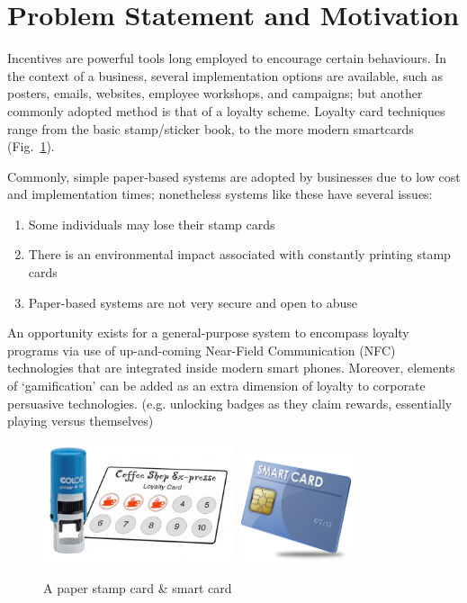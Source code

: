 \section{Problem Statement and Motivation}
Incentives are powerful tools long employed to encourage certain behaviours. In the context of a business, several implementation options are available, such as posters, emails, websites, employee workshops, and campaigns; but another commonly adopted method is that of a loyalty scheme. Loyalty card techniques range from the basic stamp/sticker book, to the more modern smartcards (Fig.~\ref{fig:smartcard}).

Commonly, simple paper-based systems are adopted by businesses due to low cost and implementation times; nonetheless systems like these have several issues:
\begin{enumerate}
\item Some individuals may lose their stamp cards
\item There is an environmental impact associated with constantly printing stamp cards
\item Paper-based systems are not very secure and open to abuse
\end{enumerate}

An opportunity exists for a general-purpose system to encompass loyalty programs via use of up-and-coming Near-Field Communication (NFC) technologies that are integrated inside modern smart phones. Moreover, elements of `gamification' can be added as an extra dimension of loyalty to corporate persuasive technologies. (e.g. unlocking badges as they claim rewards, essentially playing versus themselves)

\begin{figure}[h!]
    \centering
    \includegraphics[width=0.5\textwidth]{img/Loyalty-card.jpg}
    \qquad
    \includegraphics[width=0.3\textwidth]{img/smartcard.png}
    \caption{A paper stamp card \& smart card}%
    \label{fig:smartcard}
\end{figure}
\clearpage{}

